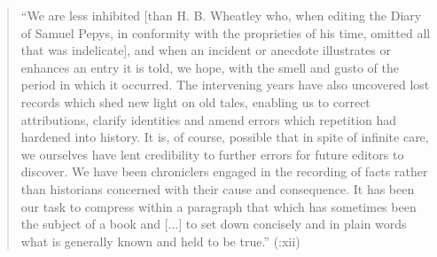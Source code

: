 \documentclass[fontsize=12pt]{scrartcl}
\begin{document}
\singlespacing
\begin{quote}
"`We are less inhibited [than H. B. Wheatley who, when editing the Diary of Samuel Pepys, in conformity with the proprieties of his time, omitted all that was indelicate], and when an incident or anecdote illustrates or enhances an entry it is told, we hope, with the smell and gusto of the period in which it occurred. The intervening years have also uncovered lost records which shed new light on old tales, enabling us to correct attributions, clarify identities and amend errors which repetition had hardened into history. It is, of course, possible that in spite of infinite care, we ourselves have lent credibility to further errors for future editors to discover. We have been chroniclers engaged in the recording of facts rather than historians concerned with their cause and consequence. It has been our task to compress within a paragraph that which has sometimes been the subject of a book and [...] to set down concisely and in plain words what is generally known and held to be true."' (\cite{Weinreb1983}:xii)
\end{quote}
\onehalfspacing
\end{document}
